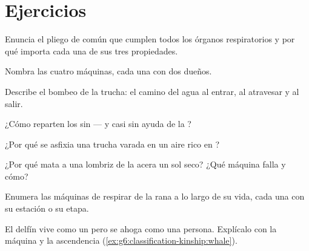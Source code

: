 \section{Ejercicios}

\begin{exercise}[$\star$]\label{exo:g7:how-animals-breathe:1}
Enuncia el pliego de  común que cumplen todos los órganos
respiratorios y por qué importa cada una de sus tres propiedades.
\end{exercise}

\begin{exercise}[$\star$]\label{exo:g7:how-animals-breathe:2}
Nombra las cuatro máquinas, cada una con dos dueños.
\end{exercise}

\begin{exercise}[$\star$]\label{exo:g7:how-animals-breathe:3}
Describe el bombeo de la trucha: el camino del agua al entrar, al
atravesar y al salir.
\end{exercise}

\begin{exercise}[$\star$]\label{exo:g7:how-animals-breathe:4}
¿Cómo reparten  los  sin  --- y casi sin ayuda
de la ?
\end{exercise}

\begin{exercise}[$\star$]\label{exo:g7:how-animals-breathe:5}
¿Por qué se asfixia una trucha varada en un aire rico en ?
\end{exercise}

\begin{exercise}[$\star$]\label{exo:g7:how-animals-breathe:6}
¿Por qué mata a una lombriz de la acera un sol seco? ¿Qué máquina falla
y cómo?
\end{exercise}

\begin{exercise}[$\star\star$]\label{exo:g7:how-animals-breathe:7}
Enumera las máquinas de respirar de la rana a lo largo de su vida, cada
una con su estación o su etapa.
\end{exercise}

\begin{exercise}[$\star\star$]\label{exo:g7:how-animals-breathe:8}
El delfín vive como un  pero se ahoga como una persona. Explícalo
con la máquina y la ascendencia
(\cref{ex:g6:classification-kinship:whale}).
\end{exercise}

